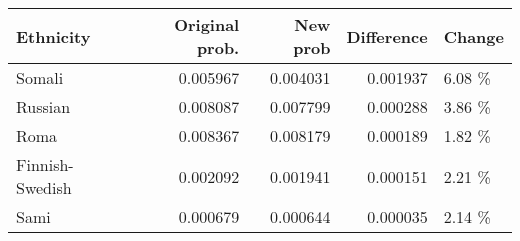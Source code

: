 \begin{tabular}{lrrrl}
\toprule
      Ethnicity &  Original prob. &  New prob &  Difference & Change \\
\midrule
         Somali &        0.005967 &  0.004031 &    0.001937 & 6.08 \% \\
        Russian &        0.008087 &  0.007799 &    0.000288 & 3.86 \% \\
           Roma &        0.008367 &  0.008179 &    0.000189 & 1.82 \% \\
Finnish-Swedish &        0.002092 &  0.001941 &    0.000151 & 2.21 \% \\
           Sami &        0.000679 &  0.000644 &    0.000035 & 2.14 \% \\
\bottomrule
\end{tabular}
